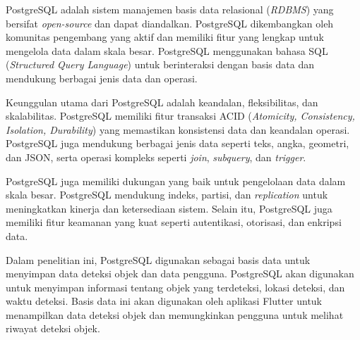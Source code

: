 PostgreSQL adalah sistem manajemen basis data relasional (\emph{RDBMS}) yang bersifat \emph{open-source} dan dapat diandalkan. PostgreSQL dikembangkan oleh komunitas pengembang yang aktif dan memiliki fitur yang lengkap untuk mengelola data dalam skala besar. PostgreSQL menggunakan bahasa SQL (\emph{Structured Query Language}) untuk berinteraksi dengan basis data dan mendukung berbagai jenis data dan operasi. \parencite*{postgresql2025}

Keunggulan utama dari PostgreSQL adalah keandalan, fleksibilitas, dan skalabilitas. PostgreSQL memiliki fitur transaksi ACID (\emph{Atomicity, Consistency, Isolation, Durability}) yang memastikan konsistensi data dan keandalan operasi. PostgreSQL juga mendukung berbagai jenis data seperti teks, angka, geometri, dan JSON, serta operasi kompleks seperti \emph{join}, \emph{subquery}, dan \emph{trigger}.

PostgreSQL juga memiliki dukungan yang baik untuk pengelolaan data dalam skala besar. PostgreSQL mendukung indeks, partisi, dan \emph{replication} untuk meningkatkan kinerja dan ketersediaan sistem. Selain itu, PostgreSQL juga memiliki fitur keamanan yang kuat seperti autentikasi, otorisasi, dan enkripsi data.

Dalam penelitian ini, PostgreSQL digunakan sebagai basis data untuk menyimpan data deteksi objek dan data pengguna. PostgreSQL akan digunakan untuk menyimpan informasi tentang objek yang terdeteksi, lokasi deteksi, dan waktu deteksi. Basis data ini akan digunakan oleh aplikasi Flutter untuk menampilkan data deteksi objek dan memungkinkan pengguna untuk melihat riwayat deteksi objek.